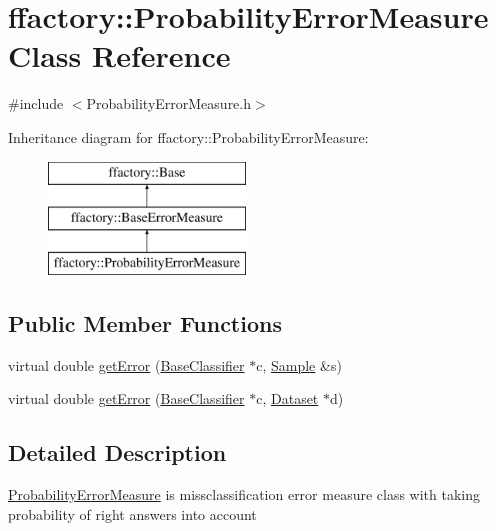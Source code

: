 \hypertarget{classffactory_1_1_probability_error_measure}{\section{ffactory\-:\-:Probability\-Error\-Measure Class Reference}
\label{classffactory_1_1_probability_error_measure}
}


{\ttfamily \#include $<$Probability\-Error\-Measure.\-h$>$}

Inheritance diagram for ffactory\-:\-:Probability\-Error\-Measure\-:\begin{figure}[H]
\begin{center}
\leavevmode
\includegraphics[height=3.000000cm]{classffactory_1_1_probability_error_measure}
\end{center}
\end{figure}
\subsection*{Public Member Functions}
\begin{DoxyCompactItemize}
\item 
virtual double \hyperlink{classffactory_1_1_probability_error_measure_abfc0dd59747fd479663e9167c8510157}{get\-Error} (\hyperlink{classffactory_1_1_base_classifier}{Base\-Classifier} $\ast$c, \hyperlink{classffactory_1_1_sample}{Sample} \&s)
\item 
virtual double \hyperlink{classffactory_1_1_probability_error_measure_ac633b58b1e3be6feafb3b9fdd7fd1388}{get\-Error} (\hyperlink{classffactory_1_1_base_classifier}{Base\-Classifier} $\ast$c, \hyperlink{classffactory_1_1_dataset}{Dataset} $\ast$d)
\end{DoxyCompactItemize}


\subsection{Detailed Description}
\hyperlink{classffactory_1_1_probability_error_measure}{Probability\-Error\-Measure} is missclassification error measure class with taking probability of right answers into account 


